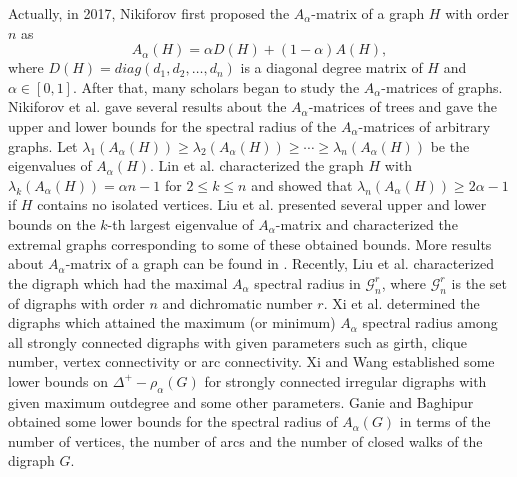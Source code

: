 \documentclass[11pt]{article}
\begin{document}
Actually, in 2017, Nikiforov \cite{Ni} first proposed the $A_\alpha$-matrix of a graph $H$ with order $n$ as
$$A_\alpha(H)=\alpha D(H)+(1-\alpha)A(H),$$
where $D(H)=diag(d_1,d_2,\ldots,d_n)$ is a diagonal degree matrix of $H$ and $\alpha\in[0,1]$. After that, many scholars began to study the $A_\alpha$-matrices of graphs. Nikiforov et al. \cite{NiPR} gave several results about the $A_\alpha$-matrices of trees and gave the upper and lower bounds for the spectral radius of the $A_\alpha$-matrices of arbitrary graphs. Let $\lambda_1(A_\alpha(H))\geq\lambda_2(A_\alpha(H))\geq\cdots\geq\lambda_n(A_\alpha(H))$ be the eigenvalues of $A_\alpha(H)$. Lin et al. \cite{LiXS} characterized the graph $H$ with $\lambda_k(A_\alpha(H))=\alpha n-1$ for $2 \leq k\leq n$ and showed that $\lambda_n(A_\alpha(H))\geq2\alpha-1$ if $H$ contains no isolated vertices. Liu et al. \cite{LiDS} presented several upper and lower bounds on the $k$-th largest eigenvalue of $A_\alpha$-matrix and characterized the extremal graphs corresponding to some of these obtained bounds. More results about $A_\alpha$-matrix of a graph can be found in \cite{LiSu,LiHX,LiLX,LiLi,NiRo,WaWT}. Recently, Liu et al. \cite{LiWC} characterized the digraph which had the maximal $A_\alpha$ spectral radius in $\mathcal{G}_n^r$, where $\mathcal{G}_n^r$ is the set of digraphs with order $n$ and dichromatic number $r$. Xi et al. \cite{XiSW} determined the digraphs which attained the maximum (or minimum) $A_\alpha$ spectral radius among all strongly connected digraphs with given parameters such as girth, clique number, vertex connectivity or arc connectivity. Xi and Wang \cite{XiWa} established some lower bounds on $\Delta^+-\rho_\alpha(G)$ for strongly connected irregular digraphs with given maximum outdegree and some other parameters. Ganie and Baghipur \cite{GaBa} obtained some lower bounds for the spectral radius of $A_\alpha(G)$ in terms of the number of vertices, the number of arcs and the number of closed walks of the digraph $G$.
\end{document}
